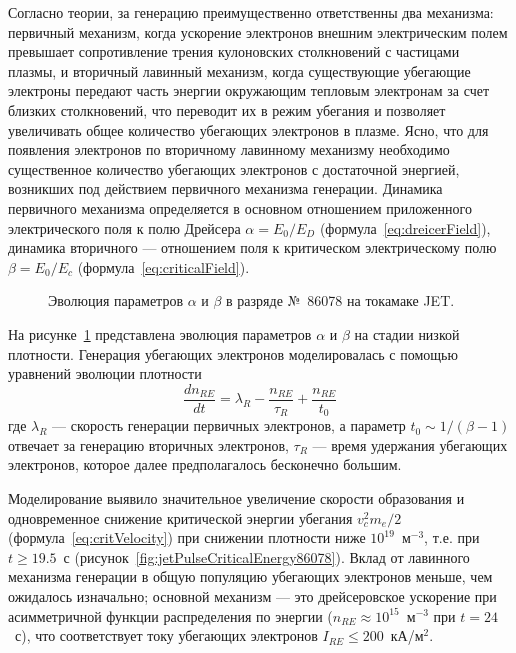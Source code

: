 Согласно теории, за генерацию преимущественно ответственны два механизма: первичный механизм, когда ускорение электронов внешним электрическим полем превышает сопротивление трения кулоновских столкновений с частицами плазмы, и вторичный лавинный механизм, когда существующие убегающие электроны передают часть энергии окружающим тепловым электронам за счет близких столкновений, что переводит их в режим убегания и позволяет увеличивать общее количество убегающих электронов в плазме. Ясно, что для появления электронов по вторичному лавинному механизму необходимо существенное количество убегающих электронов с достаточной энергией, возникших под действием первичного механизма генерации. Динамика первичного механизма определяется в основном отношением приложенного электрического поля к полю Дрейсера $\alpha = E_0/E_{D}$ (формула~\ref{eq:dreicerField}), динамика вторичного --- отношением поля к критическом электрическому полю $\beta = E_0 / E_c $ (формула~\ref{eq:criticalField}).~\cite{Plyusnin2015}

\begin{figure}[ht!]
  \caption{ Эволюция параметров $\alpha$ и $\beta$ в разряде №~86078 на токамаке JET.~\cite{Plyusnin2015} }
  \label{fig:jetPulseAlphaBeta86078}
\end{figure}

На рисунке~\ref{fig:jetPulseAlphaBeta86078} представлена эволюция параметров $\alpha$ и $\beta$ на стадии низкой плотности. Генерация убегающих электронов моделировалась с помощью уравнений эволюции плотности
\begin{equation*}
  \frac{ d n_{RE} }{ d t } = \lambda_R - \frac{ n_{RE} }{ \tau_R } + \frac{ n_{RE} }{ t_0 }
\end{equation*}
где $\lambda_R$ --- скорость генерации первичных электронов, а параметр $t_0 \sim 1/(\beta - 1 )$ отвечает за генерацию вторичных электронов, $\tau_R$ --- время удержания убегающих электронов, которое далее предполагалось бесконечно большим.~\cite{Plyusnin2015}

Моделирование выявило значительное увеличение скорости образования и одновременное снижение критической энергии убегания $v_c^2 m_e /2$ (формула~\ref{eq:critVelocity}) при снижении плотности ниже $10^{19}$~м${}^{-3}$, т.е. при $t \ge 19.5$~с (рисунок~\ref{fig:jetPulseCriticalEnergy86078}). Вклад от лавинного механизма генерации в общую популяцию убегающих электронов меньше, чем ожидалось изначально; основной механизм --- это дрейсеровское ускорение при асимметричной функции распределения по энергии ($n_{RE} \approx 10^{15}$~м${}^{-3}$ при $t = 24$~с), что соответствует току убегающих электронов $I_{RE} \le 200$~кА/м${}^2$. 


